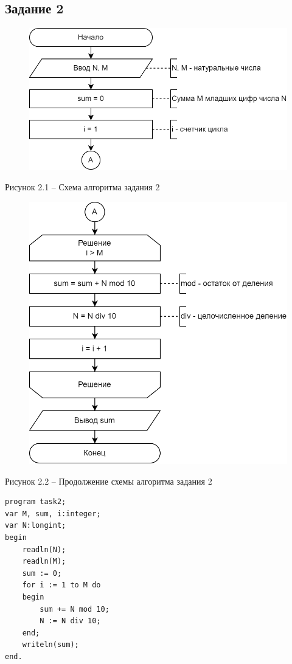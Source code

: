 \documentclass[a4paper,14pt]{extarticle}
\begin{document}
	\subsection*{Задание 2}
	\begin{figure}[h]
		\centering
		\includegraphics[width=0.6\linewidth]{schemes/t-2-1}
	\end{figure}
	\begin{center}
		Рисунок 2.1 – Схема алгоритма задания 2
	\end{center}
	\pagebreak
	\begin{figure}[h]
		\centering
		\includegraphics[width=0.6\linewidth]{schemes/t-2-2}
	\end{figure}
	\begin{center}
		Рисунок 2.2 – Продолжение схемы алгоритма задания 2
	\end{center}
	
	\begin{lstlisting}
program task2;
var M, sum, i:integer;
var N:longint;
begin
    readln(N);
    readln(M);
    sum := 0;
    for i := 1 to M do
    begin
        sum += N mod 10;
        N := N div 10;
    end;
    writeln(sum);
end.
	\end{lstlisting}
	
	\pagebreak
\end{document}
